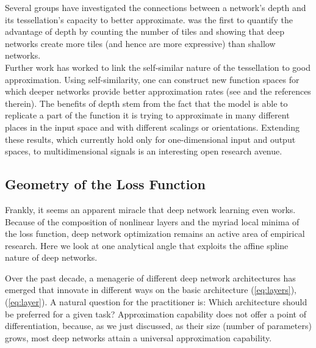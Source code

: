 \documentclass{notices}
\begin{document}
Several groups have investigated the connections between a network's depth and its tessellation's capacity to better approximate.
\cite{montufar2014number} was the first to quantify the advantage of depth by counting the number of tiles and showing that deep networks create more tiles (and hence are more expressive) than shallow networks.
\\

Further work has worked to link the self-similar nature of the tessellation to good approximation.
Using self-similarity, one can construct new function spaces for which deeper networks provide better approximation rates (see \cite{devore2021neural,daubechies2022nonlinear} and the references therein).
The benefits of depth stem from the fact that the model is able to replicate a part of the function it is trying to approximate in many different places in the input space and with different scalings or orientations.
Extending these results, which currently hold  only for one-dimensional input and output spaces, to multidimensional signals is an interesting open research avenue.



\subsection*{Geometry of the Loss Function}



Frankly, it seems an apparent miracle that deep network learning even works.
Because of the composition of nonlinear layers and the myriad local minima of the loss function, deep network optimization remains an active area of empirical research.
Here we look at one analytical angle that exploits the affine spline nature of deep networks.


Over the past decade, a menagerie of different deep network architectures has emerged that innovate in different ways on the basic architecture (\ref{eq:layers}), (\ref{eq:layer}).
A natural question for the practitioner is: Which architecture should be preferred for a given task?
Approximation capability does not offer a point of differentiation, because, as we just discussed, as their size (number of parameters) grows, most deep networks attain a universal approximation capability. 
\end{document}
